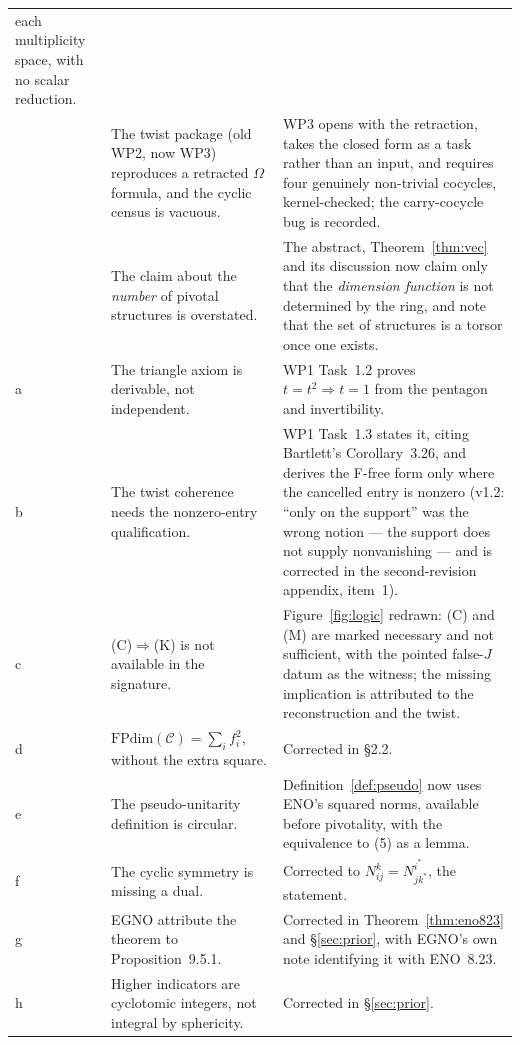 \documentclass[11pt,a4paper]{article}
\theoremstyle{remark}
\newcommand{\code}[1]{\texttt{\detokenize{#1}}}
\newcommand{\C}{\mathcal{C}}
\newcommand{\FPdim}{\mathrm{FPdim}}
\begin{document}
\begin{center}
\begin{longtable}{@{}>{\raggedright\arraybackslash}p{}>{\raggedright\arraybackslash}p{}>{\raggedright\arraybackslash}p{}@{}}
each multiplicity space, with no scalar reduction. \\
7 & The twist package (old WP2, now WP3) reproduces a retracted $\Omega$ formula, and the cyclic
census is vacuous. & WP3 opens
with the retraction, takes the closed form as a task rather than an input, and requires four
genuinely non-trivial cocycles, kernel-checked; the carry-cocycle bug is recorded. \\
8 & The claim about the \emph{number} of pivotal structures is overstated. & The abstract,
Theorem~\ref{thm:vec} and its discussion now claim only that the \emph{dimension function} is not
determined by the ring, and note that the set of structures is a torsor once one exists. \\
\midrule
a & The triangle axiom is derivable, not independent. & WP1 Task~1.2 proves $t = t^{2} \Rightarrow
t = 1$ from the pentagon and invertibility. \\
b & The twist coherence needs the nonzero-entry qualification. & WP1 Task~1.3 states it, citing
Bartlett's Corollary~3.26, and derives the F-free form only where the cancelled entry is
nonzero (v1.2: ``only on the support'' was the wrong notion --- the support does not supply
nonvanishing --- and is corrected in the second-revision appendix, item~1). \\
c & (C)$\Rightarrow$(K) is not available in the signature. & Figure~\ref{fig:logic} redrawn: (C)
and (M) are marked necessary and not sufficient, with the pointed false-$J$ datum as the witness;
the missing implication is attributed to the reconstruction and the twist. \\
d & $\FPdim(\C) = \sum_i f_i^{2}$, without the extra square. & Corrected in \S2.2. \\
e & The pseudo-unitarity definition is circular. & Definition~\ref{def:pseudo} now uses ENO's
squared norms, available before pivotality, with the equivalence to (5) as a lemma. \\
f & The cyclic symmetry is missing a dual. & Corrected to $N_{ij}^{k} = N_{j k^*}^{i^*}$, the
\code{cyclic1} statement. \\
g & EGNO attribute the theorem to Proposition~9.5.1. & Corrected in Theorem~\ref{thm:eno823} and
\S\ref{sec:prior}, with EGNO's own note identifying it with ENO~8.23. \\
h & Higher indicators are cyclotomic integers, not integral by sphericity. & Corrected in
\S\ref{sec:prior}. \\
\end{longtable}
\end{center}
\end{document}
